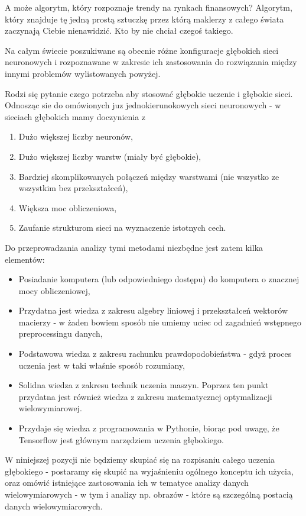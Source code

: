 \documentclass[10pt,a4paper]{book}
\begin{document}
\begin{problem*}
A może algorytm, który rozpoznaje trendy na rynkach finansowych? Algorytm, który znajduje tę jedną prostą sztuczkę przez którą maklerzy z całego świata zaczynają Ciebie nienawidzić. Kto by nie chciał czegoś takiego.
\end{problem*}

Na całym świecie poszukiwane są obecnie różne konfiguracje głębokich sieci neuronowych i rozpoznawane w zakresie ich zastosowania do rozwiązania między innymi problemów wylistowanych powyżej.

Rodzi się pytanie czego potrzeba aby stosować głębokie uczenie i głębokie sieci. Odnosząc sie do omówionych juz jednokierunokowych sieci neuronowych - w sieciach głębokich mamy doczynienia z 
\begin{enumerate}
\item Dużo większej liczby neuronów,
\item Dużo większej liczby warstw (miały być głębokie),
\item Bardziej skomplikowanych połączeń między warstwami (nie wszystko ze wszystkim bez przekształceń),
\item Większa moc obliczeniowa,
\item Zaufanie strukturom sieci na wyznaczenie istotnych cech.
\end{enumerate}

Do przeprowadzania analizy tymi metodami niezbędne jest zatem kilka elementów:
\begin{itemize}
\item Posiadanie komputera (lub odpowiedniego dostępu) do komputera o znacznej mocy obliczeniowej,
\item Przydatna jest wiedza z zakresu algebry liniowej i przekształceń wektorów macierzy - w żaden bowiem sposób nie umiemy uciec od zagadnień wstępnego preprocessingu danych,
\item Podstawowa wiedza z zakresu rachunku prawdopodobieństwa - gdyż proces uczenia jest w taki właśnie sposób rozumiany,
\item Solidna wiedza z zakresu technik uczenia maszyn. Poprzez ten punkt przydatna jest również wiedza z zakresu matematycznej optymalizacji wielowymiarowej.
\item Przydaje się wiedza z programowania w Pythonie, biorąc pod uwagę, że Tensorflow jest głównym narzędziem uczenia głębokiego.
\end{itemize}

W niniejszej pozycji nie będziemy skupiać się na rozpisaniu całego uczenia głębokiego - postaramy się skupić na wyjaśnieniu ogólnego konceptu ich użycia, oraz omówić istniejące zastosowania ich w tematyce analizy danych wielowymiarowych - w tym i analizy np. obrazów - które są szczególną postacią danych wielowymiarowych.
\end{document}
